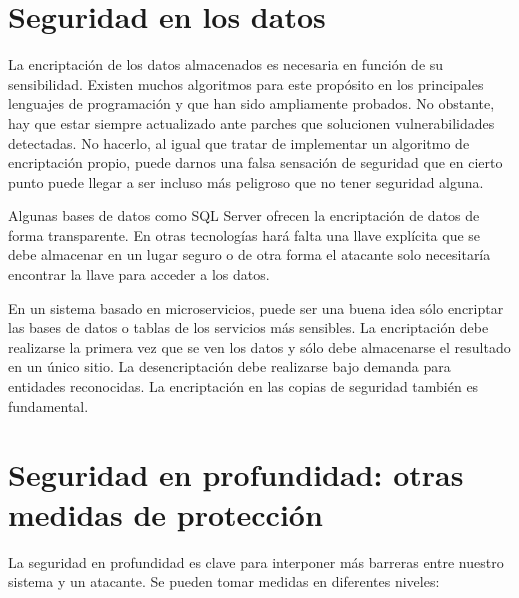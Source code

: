 \documentclass[11pt,a4paper]{article}
\begin{document}
\section{Seguridad en los datos}

La encriptación de los datos almacenados es necesaria en función de su sensibilidad. Existen muchos algoritmos para este propósito en los principales lenguajes de programación y que han sido ampliamente probados. No obstante, hay que estar siempre actualizado ante parches que solucionen vulnerabilidades detectadas. No hacerlo, al igual que tratar de implementar un algoritmo de encriptación propio, puede darnos una falsa sensación de seguridad que en cierto punto puede llegar a ser incluso más peligroso que no tener seguridad alguna.

Algunas bases de datos como SQL Server ofrecen la encriptación de datos de forma transparente. En otras tecnologías hará falta una llave explícita que se debe almacenar en un lugar seguro o de otra forma el atacante solo necesitaría encontrar la llave para acceder a los datos. 

En un sistema basado en microservicios, puede ser una buena idea sólo encriptar las bases de datos o tablas de los servicios más sensibles. La encriptación debe realizarse la primera vez que se ven los datos y sólo debe almacenarse el resultado en un único sitio. La desencriptación debe realizarse bajo demanda para entidades reconocidas. La encriptación en las copias de seguridad también es fundamental.

\section{Seguridad en profundidad: otras medidas de protección}

La seguridad en profundidad es clave para interponer más barreras entre nuestro sistema y un atacante. Se pueden tomar medidas en diferentes niveles:
\end{document}

